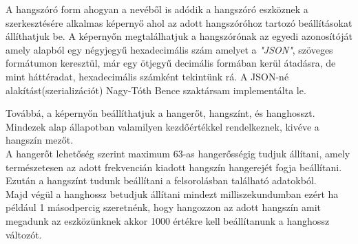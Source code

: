 \documentclass[tocnopagenum]{thesis-ekf}
\theoremstyle{definition}
\theoremstyle{remark}
\begin{document}
	A hangszóró form ahogyan a nevéből is adódik a hangszóró eszköznek a szerkesztésére alkalmas képernyő ahol az adott hangszóróhoz tartozó beállításokat állíthatjuk be.
	A képernyőn megtalálhatjuk a hangszórónak az egyedi azonosítóját amely alapból egy négyjegyű hexadecimális szám amelyet a \textit{"JSON"}, szöveges formátumon keresztül, már egy ötjegyű decimális formában kerül átadásra, de mint háttéradat, hexadecimális számként tekintünk rá. A JSON-né alakítást(szerializációt) Nagy-Tóth Bence szaktársam implementálta le.
	 
	Továbbá, a képernyőn beállíthatjuk a hangerőt, hangszínt, és hanghosszt. Mindezek alap állapotban valamilyen kezdőértékkel rendelkeznek, kivéve a hangszín mezőt.
	\\
	A hangerőt lehetőség szerint maximum 63-as hangerősségig tudjuk állítani, amely természetesen az adott frekvencián kiadott hangszín hangerejét fogja beállítani.
	\\
	Ezután a hangszínt tudunk beállítani a felsorolásban található adatokból.
	\\
	Majd végül a hanghossz betudjuk állítani mindezt milliszekundumban ezért ha például 1 másodpercig szeretnénk, hogy hangozzon az adott hangszín amit megadunk az eszközünknek akkor 1000 értékre kell beállítanunk a hanghossz változót.
\end{document}

